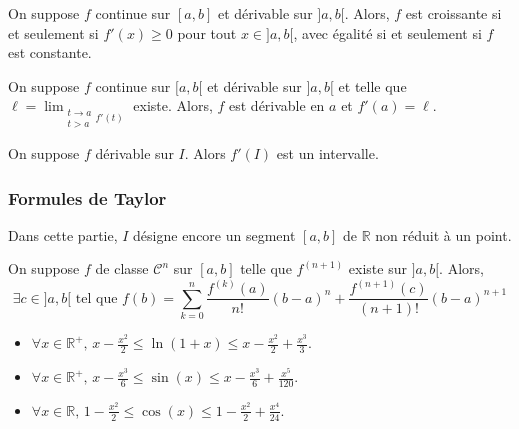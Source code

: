 	\begin{corollary}
		On suppose $f$ continue sur $[a,b]$ et dérivable sur $]a,b[$. Alors, $f$ est croissante si et seulement si $f'(x) \geq 0$ pour tout $x \in ]a,b[$, avec égalité si et seulement si $f$ est constante.
	\end{corollary}

	\begin{corollary}
		On suppose $f$ continue sur $[a,b[$ et dérivable sur $]a,b[$ et telle que $\ell = \lim_{\substack{t \rightarrow a \\ t > a} f'(t)}$ existe. Alors, $f$ est dérivable en $a$ et $f'(a) = \ell$.
	\end{corollary}


	\begin{theorem}[Darboux]
		On suppose $f$ dérivable sur $I$. Alors $f'(I)$ est un intervalle.
	\end{theorem}

	\subsubsection{Formules de Taylor}


	Dans cette partie, $I$ désigne encore un segment $[a,b]$ de $\mathbb{R}$ non réduit à un point.

	\begin{theorem}
		On suppose $f$ de classe $\mathcal{C}^n$ sur $[a,b]$ telle que $f^{(n+1)}$ existe sur $]a,b[$. Alors,
		\[ \exists c \in ]a,b[ \text{ tel que } f(b) = \sum_{k=0}^{n} \frac{f^{(k)} (a)}{n!} (b-a)^n + \frac{f^{(n+1)}(c)}{(n+1)!} (b-a)^{n+1} \]
	\end{theorem}

	\begin{application}
		\begin{itemize}
			\item $\forall x \in \mathbb{R}^+, \, x - \frac{x^2}{2} \leq \ln(1+x) \leq x - \frac{x^2}{2} + \frac{x^3}{3}$.
			\item $\forall x \in \mathbb{R}^+, \, x - \frac{x^3}{6} \leq \sin(x) \leq x - \frac{x^3}{6} + \frac{x^5}{120}$.
			\item $\forall x \in \mathbb{R}, \, 1 - \frac{x^2}{2} \leq \cos(x) \leq 1 - \frac{x^2}{2} + \frac{x^4}{24}$.
		\end{itemize}
	\end{application}

